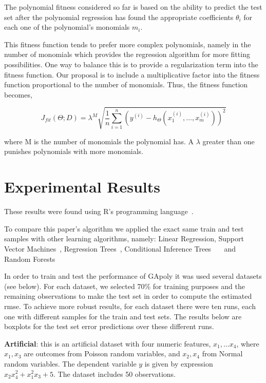 \documentclass[a4paper, 12pt]{article}
\begin{document}
The polynomial fitness considered so far is based on the ability to predict the test set after the polynomial regression has found the appropriate coefficients $\theta_i$ for each one of the polynomial's monomials $m_i$.

This fitness function tends to prefer more complex polynomials, namely in the number of monomials which provides the regression algorithm for more fitting possibilities. One way to balance this is to provide a regularization term into the fitness function. Our proposal is to include a multiplicative factor into the fitness function proportional to the number of monomials. Thus, the fitness function becomes,

$$
J_{fit}\left( \Theta; D \right) = \lambda^{M} \sqrt{ \frac{1}{n} \sum_{i=1}^n \left( y^{(i)} - h_{\Theta}\left(x_1^{(i)}, \ldots, x_m^{(i)}\right) \right)^2 }
$$

where M is the number of monomials the polynomial has. A $\lambda$ greater than one punishes polynomials with more monomials.

\section{Experimental Results}

These results were found using R's programming language~\cite{R}.

To compare this paper's algorithm we applied the exact same train and test samples with other learning algorithms, namely: Linear Regression, Support Vector Machines~\cite{Meyer12}, Regression Trees~\cite{Therneau13}, Conditional Inference Trees~\cite{Hothorn06}~\cite{Strobl07}~\cite{Strobl08} and Random Forests~\cite{Liaw02}

In order to train and test the performance of GApoly it was used several datasets (see below). For each dataset, we selected 70\% for training purposes and the remaining observations to make the test set in order to compute the estimated rmse. To achieve more robust results, for each dataset there were ten runs, each one with different samples for the train and test sets. The results below are boxplots for the test set error predictions over these different runs.

\textbf{Artificial}: this is an artificial dataset with four numeric features, $x_1, \ldots x_4$, where $x_1,x_3$ are outcomes from Poisson random variables, and $x_2,x_4$ from Normal random variables. The dependent variable $y$ is given by expression $x_2x_4^2 + x_1^2x_3 + 5$. The dataset includes 50 observations. 
\end{document}
